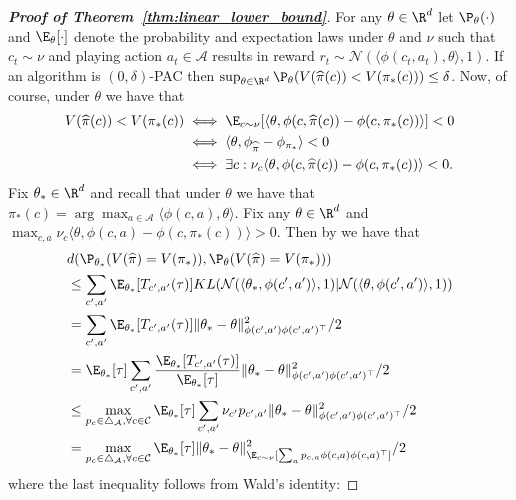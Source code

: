 \documentclass{article}
\newcommand{\mc}[1]{\mathcal{#1}}
\newcommand{\1}{\mathbf{1}}
\begin{document}
\begin{proof}[\textbf{Proof of Theorem~\ref{thm:linear_lower_bound}}]
For any $\theta \in \R^d$ let $\P_{\theta}( \cdot )$ and $\E_{\theta}[ \cdot ]$ denote the probability and expectation laws under $\theta$ and $\nu$ such that $c_t \sim \nu$ and playing action $a_t \in \mc{A}$ results in reward $r_t \sim \mc{N}( \langle \phi(c_t,a_t), \theta\rangle , 1 )$.
If an algorithm is $(0,\delta)$-PAC then $\sup_{\theta \in \R^d} \P_\theta( V(\widehat{\pi}(c)) < V(\pi_*(c))  ) \leq \delta$.
Now, of course, under $\theta$ we have that 
\begin{align*}
    V(\widehat{\pi}(c)) < V(\pi_*(c)) &\iff \E_{c \sim \nu}[ \langle \theta, \phi(c,\widehat{\pi}(c)) - \phi(c,\pi_*(c)) \rangle] < 0 \\
    &\iff \langle \theta, \phi_{\widehat{\pi}} -  \phi_{\pi_*} \rangle < 0\\
    &\iff \exists c : \nu_c \langle \theta, \phi(c,\widehat{\pi}(c)) - \phi(c,\pi_*(c)) \rangle  < 0.
\end{align*}
Fix $\theta_* \in \R^d$ and recall that under $\theta$ we have that $\pi_*(c) = \arg\max_{a \in \mc{A}} \langle \phi(c,a) , \theta \rangle$.
Fix any $\theta \in \R^d$ and $\max_{c,a} \nu_c \langle \theta, \phi(c,a) - \phi(c,\pi_*(c)) \rangle > 0$.
Then by \cite[Lemma 1]{kaufmann2016complexity} we have that
\begin{align*}
    &d( \P_{\theta_*}( V(\widehat{\pi}) = V(\pi_*) ), \P_{\theta}( V(\widehat{\pi}) = V(\pi_*) ) ) \\
    &\leq \sum_{c',a'} \E_{\theta_*}[ T_{c',a'} (\tau) ] KL( \mc{N}(\langle \theta_*, \phi(c',a') \rangle,1) | \mc{N}(\langle \theta, \phi(c',a') \rangle,1) ) \\
    &= \sum_{c',a'} \E_{\theta_*}[ T_{c',a'} (\tau) ]  \| \theta_* - \theta \|_{\phi(c',a') \phi(c',a')^\top}^2 /2 \\ 
    &= \E_{\theta_*}[\tau] \sum_{c',a'} \frac{\E_{\theta_*}[ T_{c',a'} (\tau) ]}{\E_{\theta_*}[\tau]}  \| \theta_* - \theta \|_{\phi(c',a') \phi(c',a')^\top}^2 /2 \\ 
    &\leq \max_{p_c \in \triangle_{\mc{A}}, \forall c \in \mc{C}} \E_{\theta_*}[\tau] \sum_{c',a'} \nu_{c'} p_{c',a'} \| \theta_* - \theta \|_{\phi(c',a') \phi(c',a')^\top}^2 /2 \\
    &= \max_{p_c \in \triangle_{\mc{A}}, \forall c \in \mc{C}} \E_{\theta_*}[\tau]  \| \theta_* - \theta \|_{\E_{c \sim \nu}[ \sum_{a} p_{c,a} \phi(c,a) \phi(c,a)^\top]}^2 /2
\end{align*}
where the last inequality follows from Wald's identity:

\end{proof}
\end{document}

